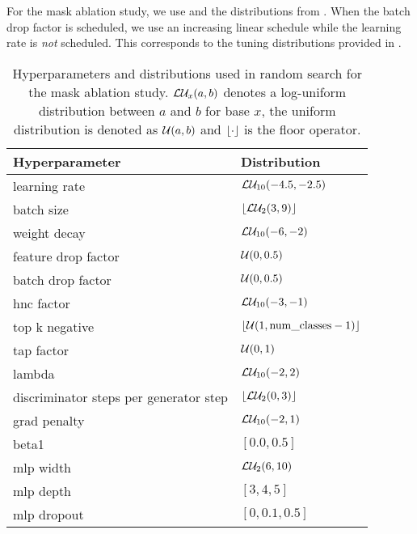 For the mask ablation study, we use \adam \citep{Kingma2015} and the distributions from . When the batch drop factor is scheduled, we use an increasing linear schedule while the learning rate is \emph{not} scheduled. This corresponds to the tuning distributions provided in \domainbed.
\begin{table}[!htbp]
    \centering
    \begin{tabular}{ll}
        \toprule
        \textbf{Hyperparameter} & \textbf{Distribution} \\
        \midrule
        learning rate & $\loguni{-4.5}{-2.5}$ \\
        batch size  & $\floor*{\logunitwo{3}{9}}$ \\
        weight decay  & $\loguni{-6}{-2}$ \\
        feature drop factor  & $\uni{0}{0.5}$ \\
        batch drop factor  & $\uni{0}{0.5}$ \\
        hnc factor & $\loguni{-3}{-1}$ \\
        top k negative & $\floor*{\uni{1}{\mathrm{num\_classes} - 1}}$ \\
        tap factor & $\uni{0}{1}$ \\
        lambda & $\loguni{-2}{2}$ \\
        discriminator steps per generator step & $\floor*{\logunitwo{0}{3}}$ \\
        grad penalty & $\loguni{-2}{1}$ \\
        beta1 & $[0.0, 0.5]$ \\
        mlp width & $\logunitwo{6}{10}$ \\
        mlp depth & $[3, 4, 5]$ \\
        mlp dropout & $[0, 0.1, 0.5]$ \\
        \bottomrule 
    \end{tabular}
    \caption[Hyperparameters and distributions used in random search for the mask ablation study]{Hyperparameters and distributions used in random search for the mask ablation study. $\logunix{a}{b}$ denotes a log-uniform distribution between $a$ and $b$ for base $x$, the uniform distribution is denoted as $\uni{a}{b}$ and $\floor*{\cdot}$ is the floor operator.}
    \label{tab:abl-distributions-mask}
\end{table}